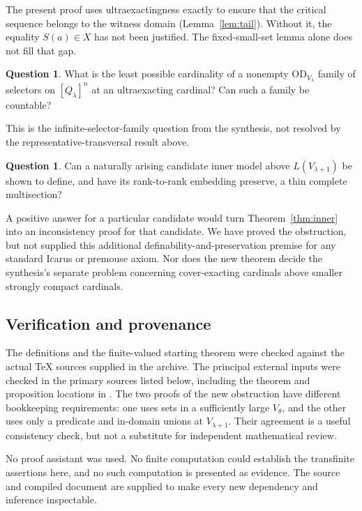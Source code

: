 \documentclass[11pt,letterpaper]{article}
\theoremstyle{definition}
\newtheorem{question}[definition]{Question}
\numberwithin{equation}{section}
\newcommand{\OD}{\mathrm{OD}}
\begin{document}
The present proof uses ultraexactingness exactly to ensure that the critical sequence belongs to the witness domain (Lemma~\ref{lem:tail}). Without it, the equality $S(a)\in X$ has not been justified. The fixed-small-set lemma alone does not fill that gap.

\begin{question}
What is the least possible cardinality of a nonempty $\OD_{V_\lambda}$ family of selectors on $[Q_\lambda]^n$ at an ultraexacting cardinal? Can such a family be countable?
\end{question}

This is the infinite-selector-family question from the synthesis, not resolved by the representative-transversal result above.

\begin{question}
Can a naturally arising candidate inner model above $L(V_{\lambda+1})$ be shown to define, and have its rank-to-rank embedding preserve, a thin complete multisection?
\end{question}

A positive answer for a particular candidate would turn Theorem~\ref{thm:inner} into an inconsistency proof for that candidate. We have proved the obstruction, but not supplied this additional definability-and-preservation premise for any standard Icarus or premouse axiom. Nor does the new theorem decide the synthesis's separate problem concerning cover-exacting cardinals above smaller strongly compact cardinals.

\subsection{Verification and provenance}

The definitions and the finite-valued starting theorem were checked against the actual TeX sources supplied in the archive. The principal external inputs were checked in the primary sources listed below, including the theorem and proposition locations in \cite{abgl}. The two proofs of the new obstruction have different bookkeeping requirements: one uses sets in a sufficiently large $V_\theta$, and the other uses only a predicate and in-domain unions at $V_{\lambda+1}$. Their agreement is a useful consistency check, but not a substitute for independent mathematical review.

No proof assistant was used. No finite computation could establish the transfinite assertions here, and no such computation is presented as evidence. The source and compiled document are supplied to make every new dependency and inference inspectable.
\end{document}
